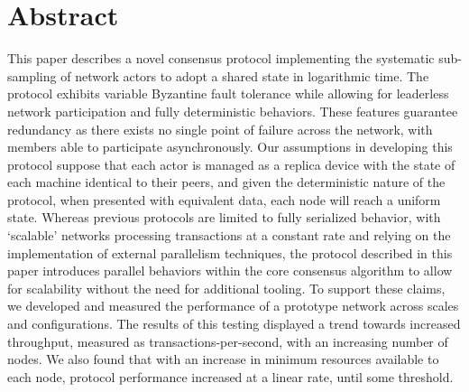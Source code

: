 \section*{Abstract}

This paper describes a novel consensus protocol implementing the systematic sub-sampling of network actors to adopt a shared state in logarithmic time. The protocol exhibits variable Byzantine fault tolerance while allowing for leaderless network participation and fully deterministic behaviors. These features guarantee redundancy as there exists no single point of failure across the network, with members able to participate asynchronously. Our assumptions in developing this protocol suppose that each actor is managed as a replica device with the state of each machine identical to their peers, and given the deterministic nature of the protocol, when presented with equivalent data, each node will reach a uniform state. Whereas previous protocols are limited to fully serialized behavior, with ‘scalable’ networks processing transactions at a constant rate and relying on the implementation of external parallelism techniques, the protocol described in this paper introduces parallel behaviors within the core consensus algorithm to allow for scalability without the need for additional tooling. To support these claims, we developed and measured the performance of a prototype network across scales and configurations. The results of this testing displayed a trend towards increased throughput, measured as transactions-per-second, with an increasing number of nodes. We also found that with an increase in minimum resources available to each node, protocol performance increased at a linear rate, until some threshold.
